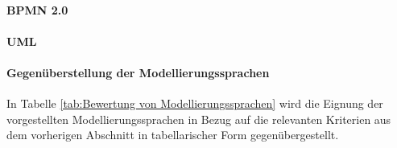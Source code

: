 \paragraph{BPMN 2.0}


\paragraph{UML}

\paragraph{Gegenüberstellung der Modellierungssprachen}
In Tabelle \ref{tab:Bewertung von Modellierungssprachen} wird die Eignung der vorgestellten Modellierungssprachen in Bezug auf die relevanten Kriterien aus dem vorherigen Abschnitt in tabellarischer Form gegenübergestellt.

